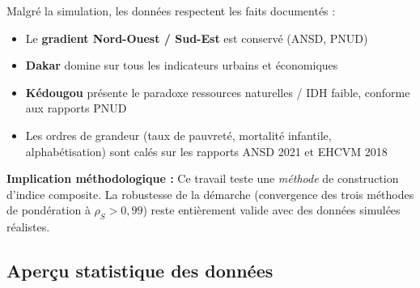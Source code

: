 \documentclass[
]{article}
\providecommand{\tightlist}{%
  \setlength{\itemsep}{0pt}\setlength{\parskip}{0pt}}
\begin{document}
Malgré la simulation, les données respectent les faits documentés :

\begin{itemize}
\tightlist
\item
  Le \textbf{gradient Nord-Ouest / Sud-Est} est conservé (ANSD, PNUD)
\item
  \textbf{Dakar} domine sur tous les indicateurs urbains et économiques
\item
  \textbf{Kédougou} présente le paradoxe ressources naturelles / IDH
  faible, conforme aux rapports PNUD
\item
  Les ordres de grandeur (taux de pauvreté, mortalité infantile,
  alphabétisation) sont calés sur les rapports ANSD 2021 et EHCVM 2018
\end{itemize}

\textbf{Implication méthodologique :} Ce travail teste une
\emph{méthode} de construction d'indice composite. La robustesse de la
démarche (convergence des trois méthodes de pondération à
\(\rho_S > 0{,}99\)) reste entièrement valide avec des données simulées
réalistes.

\subsection{Aperçu statistique des
données}\label{aperuxe7u-statistique-des-donnuxe9es}
\end{document}

